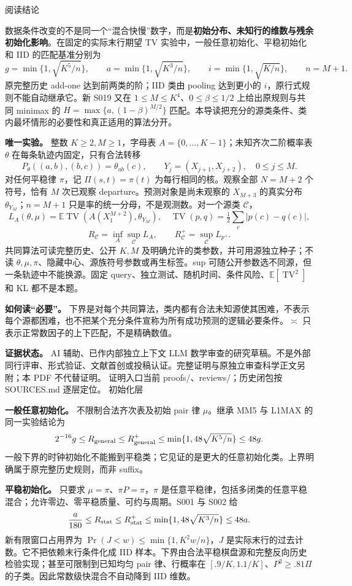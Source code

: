 \documentclass[11pt,a4paper]{article}
\newcommand{\TV}{\operatorname{TV}}\newcommand{\E}{\mathbb E}\newcommand{\R}{R_{\mathrm{D2}}}\newcommand{\Rp}{R_{\mathrm{D2}}^+}
\newcommand{\head}[2]{{\small\sffamily #1}\par\vspace{2pt}{\LARGE\bfseries #2}\par\vspace{5pt}}
\newcommand{\entry}[1]{\vfill\noindent\small 证明入口\quad #1\normalsize}
\begin{document}
\head{阅读结论}{二阶预测的条件分层与算法边界}
数据条件改变的不是同一个“混合快慢”数字，而是\textbf{初始分布、未知行的维数与残余初始化影响}。在固定的实际末行期望 TV 实验中，一般任意初始化、平稳初始化和 IID 的匹配基准分别为
\[
 g=\min\{1,\sqrt{K^5/n}\},\qquad
 a=\min\{1,\sqrt{K^3/n}\},\qquad
 i=\min\{1,\sqrt{K/n}\},\qquad n=M+1.
\]
原完整历史 add-one 达到前两类的阶；IID 类由 pooling 达到更小的 $i$，原行式规则不能自动继承它。新 S019 又在 $1\le M\le K^4$、$0\le\beta\le1/2$ 上给出原规则与共同 minimax 的 $H=\max\{a,(1-\beta)^{M/2}\}$ 匹配。本导读把充分的源类条件、类内最坏情形的必要性和真正适用的算法分开。

\textbf{唯一实验。} 整数 $K\ge2,M\ge1$，字母表 $A=\{0,\ldots,K-1\}$；未知齐次二阶概率表 $\theta$ 在每条轨迹内固定，只有合法转移
\[
 P_\theta((a,b),(b,c))=\theta_{ab}(c),\qquad
 Y_j=(X_{j+1},X_{j+2}),\quad 0\le j\le M.
\]
对任何平稳律 $\pi$，记 $\Pi(s,t)=\pi(t)$ 为每行相同的核。观察全部 $N=M+2$ 个符号，恰有 $M$ 次已观察 departure。预测对象是尚未观察的 $X_{M+3}$ 的真实分布 $\theta_{Y_M}$；$n=M+1$ 只是率的统一分母，不是观测数。对一个源类 $\mathcal C$，
\[
 L_A(\theta,\mu)=\E\TV(A(X_1^{M+2}),\theta_{Y_M}),\quad
 \TV(p,q)=\tfrac12\sum_c|p(c)-q(c)|,
\]
\[
 R_{\mathcal C}=\inf_A\sup_{\mathcal C}L_A,
 \qquad R_{\mathcal C}^{+}=\sup_{\mathcal C}L_{p^+}.
\]
共同算法可读完整历史、公开 $K,M$ 及明确允许的类参数，并可用源独立种子；不读 $\theta,\mu,\pi$、隐藏中心、源族符号参数或再生标签。sup 可随公开参数选不同源，但一条轨迹中不能换源。固定 query、独立测试、随机时间、条件风险、$\E[\TV^2]$ 和 KL 都不是本题。

\textbf{如何读“必要”。} 下界是对每个共同算法，类内都有合法未知源使其困难，不表示每个源都困难，也不把某个充分条件宣称为所有成功预测的逻辑必要条件。$\asymp$ 只表示正常数因子的上下匹配，不是精确数值。

\textbf{证据状态。} AI 辅助、已作内部独立上下文 LLM 数学审查的研究草稿。不是外部同行评审、形式验证、文献首创或投稿认证。完整证明与原独立审查科学正文另附；本 PDF 不代替证明。
\entry{当前 proofs/、reviews/；历史闭包按 SOURCES.md 逐层定位。}
\newpage
\head{初始化层}{平稳性降低难度但不要求快混合}
\textbf{一般任意初始化。} 不限制合法齐次表及初始 pair 律 $\mu$。继承 MM5 与 L1MAX 的同一实验结论为
\[
 2^{-16}g\le R_{\rm general}\le R_{\rm general}^{+}
 \le\min\{1,48\sqrt{K^5/n}\}\le48g.
\]
一般下界的时钟初始化不能搬到平稳类；它见证的是更大的任意初始化类。上界明确属于原完整历史规则，而非 suffix。

\textbf{平稳初始化。} 只要求 $\mu=\pi$、$\pi P=\pi$，$\pi$ 是任意平稳律，包括多闭类的任意平稳混合；允许零边、零平稳质量、可约与周期。S001 与 S002 给
\[
 \frac a{180}\le R_{\rm stat}\le R_{\rm stat}^{+}
 \le\min\{1,48\sqrt{K^3/n}\}\le48a.
\]
新有限窗口占用界为 $\Pr(J<w)\le\min\{1,K^2w/n\}$，$J$ 是实际末行的过去计数。它不把依赖末行条件化成 IID 样本。下界由合法平稳棋盘源和完整反向历史检验实现；甚至可限制到已知均匀 pair 律、行概率在 $[.9/K,1.1/K]$、$P^2\ge.81\Pi$ 的子类。因此常数级快混合不自动降到 IID 维数。
\end{document}
